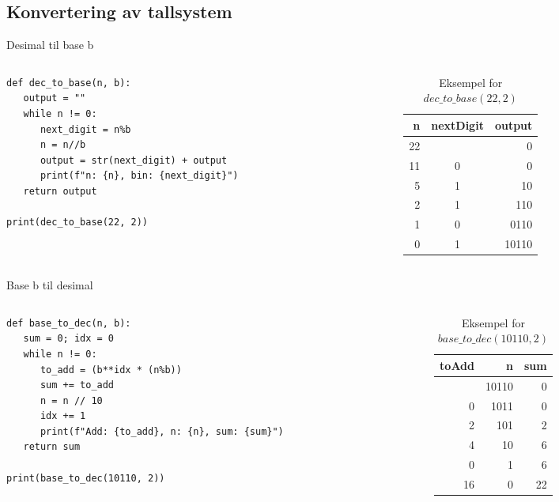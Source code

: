 \subsection*{Konvertering av tallsystem}
\begin{frame}[fragile]{Desimal til base b}
\begin{columns}
    \begin{column}{0.68\textwidth}
\begin{verbatim}
def dec_to_base(n, b):
   output = ""
   while n != 0:
      next_digit = n%b
      n = n//b
      output = str(next_digit) + output
      print(f"n: {n}, bin: {next_digit}")
   return output

print(dec_to_base(22, 2))
\end{verbatim}
 	\end{column}
    \begin{column}{0.28\textwidth}
\begin{table}
\begin{tabular}{r|c|r}
n & nextDigit & output \\ \hline
22 & & 0 \\
11 & 0 & 0\\
5 & 1 & 10\\
2 & 1 & 110\\
1 & 0 & 0110\\
0 & 1 & 10110
\end{tabular}
\caption{Eksempel for $dec\_to\_base(22, 2)$}
\end{table}
 	\end{column}
 	\end{columns}
\end{frame}

\begin{frame}[fragile]{Base b til desimal}
\begin{columns}
    \begin{column}{0.68\textwidth}
\begin{verbatim}
def base_to_dec(n, b):
   sum = 0; idx = 0
   while n != 0:
      to_add = (b**idx * (n%b))
      sum += to_add
      n = n // 10
      idx += 1
      print(f"Add: {to_add}, n: {n}, sum: {sum}")
   return sum

print(base_to_dec(10110, 2))
\end{verbatim}
 	\end{column}
    \begin{column}{0.28\textwidth}
\begin{table}
\begin{tabular}{r|r|r}
toAdd & n & sum \\ \hline
 & 10110 & 0\\
0 & 1011 & 0\\
2 & 101 & 2\\
4 & 10 & 6\\
0 & 1 & 6\\
16 & 0 & 22
\end{tabular}
\caption{Eksempel for $base\_to\_dec(10110, 2)$}
\end{table}
 	\end{column}
 	\end{columns}
\end{frame}

